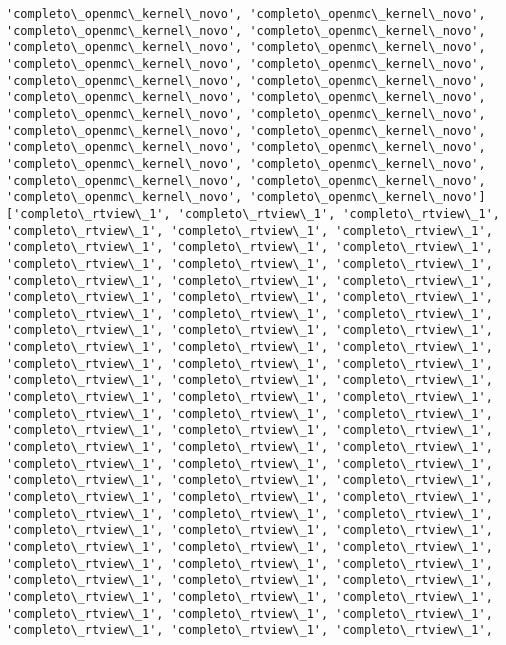 \documentclass[11pt]{article}
\begin{document}
\begin{Verbatim}[commandchars=\\\{\}]
'completo\_openmc\_kernel\_novo', 'completo\_openmc\_kernel\_novo',
'completo\_openmc\_kernel\_novo', 'completo\_openmc\_kernel\_novo',
'completo\_openmc\_kernel\_novo', 'completo\_openmc\_kernel\_novo',
'completo\_openmc\_kernel\_novo', 'completo\_openmc\_kernel\_novo',
'completo\_openmc\_kernel\_novo', 'completo\_openmc\_kernel\_novo',
'completo\_openmc\_kernel\_novo', 'completo\_openmc\_kernel\_novo',
'completo\_openmc\_kernel\_novo', 'completo\_openmc\_kernel\_novo',
'completo\_openmc\_kernel\_novo', 'completo\_openmc\_kernel\_novo',
'completo\_openmc\_kernel\_novo', 'completo\_openmc\_kernel\_novo',
'completo\_openmc\_kernel\_novo', 'completo\_openmc\_kernel\_novo',
'completo\_openmc\_kernel\_novo', 'completo\_openmc\_kernel\_novo',
'completo\_openmc\_kernel\_novo', 'completo\_openmc\_kernel\_novo']
['completo\_rtview\_1', 'completo\_rtview\_1', 'completo\_rtview\_1',
'completo\_rtview\_1', 'completo\_rtview\_1', 'completo\_rtview\_1',
'completo\_rtview\_1', 'completo\_rtview\_1', 'completo\_rtview\_1',
'completo\_rtview\_1', 'completo\_rtview\_1', 'completo\_rtview\_1',
'completo\_rtview\_1', 'completo\_rtview\_1', 'completo\_rtview\_1',
'completo\_rtview\_1', 'completo\_rtview\_1', 'completo\_rtview\_1',
'completo\_rtview\_1', 'completo\_rtview\_1', 'completo\_rtview\_1',
'completo\_rtview\_1', 'completo\_rtview\_1', 'completo\_rtview\_1',
'completo\_rtview\_1', 'completo\_rtview\_1', 'completo\_rtview\_1',
'completo\_rtview\_1', 'completo\_rtview\_1', 'completo\_rtview\_1',
'completo\_rtview\_1', 'completo\_rtview\_1', 'completo\_rtview\_1',
'completo\_rtview\_1', 'completo\_rtview\_1', 'completo\_rtview\_1',
'completo\_rtview\_1', 'completo\_rtview\_1', 'completo\_rtview\_1',
'completo\_rtview\_1', 'completo\_rtview\_1', 'completo\_rtview\_1',
'completo\_rtview\_1', 'completo\_rtview\_1', 'completo\_rtview\_1',
'completo\_rtview\_1', 'completo\_rtview\_1', 'completo\_rtview\_1',
'completo\_rtview\_1', 'completo\_rtview\_1', 'completo\_rtview\_1',
'completo\_rtview\_1', 'completo\_rtview\_1', 'completo\_rtview\_1',
'completo\_rtview\_1', 'completo\_rtview\_1', 'completo\_rtview\_1',
'completo\_rtview\_1', 'completo\_rtview\_1', 'completo\_rtview\_1',
'completo\_rtview\_1', 'completo\_rtview\_1', 'completo\_rtview\_1',
'completo\_rtview\_1', 'completo\_rtview\_1', 'completo\_rtview\_1',
'completo\_rtview\_1', 'completo\_rtview\_1', 'completo\_rtview\_1',
'completo\_rtview\_1', 'completo\_rtview\_1', 'completo\_rtview\_1',
'completo\_rtview\_1', 'completo\_rtview\_1', 'completo\_rtview\_1',
'completo\_rtview\_1', 'completo\_rtview\_1', 'completo\_rtview\_1',

\end{Verbatim}
\end{document}
